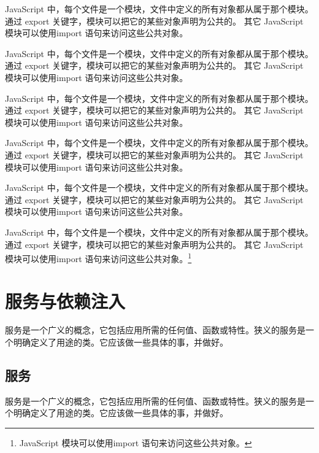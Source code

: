 \documentclass{progbookcn}
\begin{document}
\begin{information}
  JavaScript 中，每个文件是一个模块，文件中定义的所有对象都从属于那个模块。 通过 export 关键字，模块可以把它的某些对象声明为公共的。 其它 JavaScript 模块可以使用import 语句来访问这些公共对象。
  
  JavaScript 中，每个文件是一个模块，文件中定义的所有对象都从属于那个模块。 通过 export 关键字，模块可以把它的某些对象声明为公共的。 其它 JavaScript 模块可以使用import 语句来访问这些公共对象。
\end{information}


\begin{question}
  JavaScript 中，每个文件是一个模块，文件中定义的所有对象都从属于那个模块。 通过 export 关键字，模块可以把它的某些对象声明为公共的。 其它 JavaScript 模块可以使用import 语句来访问这些公共对象。
\end{question}

\begin{keypoint}
  JavaScript 中，每个文件是一个模块，文件中定义的所有对象都从属于那个模块。 通过 export 关键字，模块可以把它的某些对象声明为公共的。 其它 JavaScript 模块可以使用import 语句来访问这些公共对象。
\end{keypoint}

\begin{exclamation}
  JavaScript 中，每个文件是一个模块，文件中定义的所有对象都从属于那个模块。 通过 export 关键字，模块可以把它的某些对象声明为公共的。 其它 JavaScript 模块可以使用import 语句来访问这些公共对象。
\end{exclamation}


JavaScript 中，每个文件是一个模块，文件中定义的所有对象都从属于那个模块。 通过 export 关键字，模块可以把它的某些对象声明为公共的。 其它 JavaScript 模块可以使用import 语句来访问这些公共对象。\footnote{JavaScript 模块可以使用import 语句来访问这些公共对象。}

\chapter{服务与依赖注入}

服务是一个广义的概念，它包括应用所需的任何值、函数或特性。狭义的服务是一个明确定义了用途的类。它应该做一些具体的事，并做好。


\section{服务}

服务是一个广义的概念，它包括应用所需的任何值、函数或特性。狭义的服务是一个明确定义了用途的类。它应该做一些具体的事，并做好。
\end{document}
